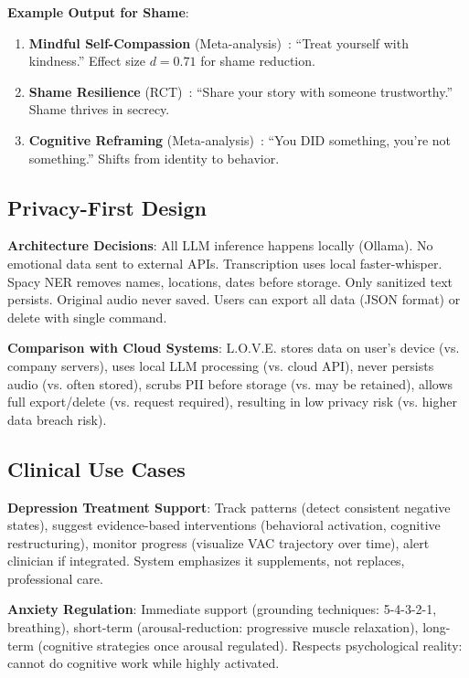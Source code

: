 \documentclass[10pt,twocolumn]{article}
\begin{document}
\textbf{Example Output for Shame}:
\begin{enumerate}
    \item \textbf{Mindful Self-Compassion} (Meta-analysis)~\cite{ferrari2019}: ``Treat yourself with kindness.'' Effect size $d=0.71$ for shame reduction.
    \item \textbf{Shame Resilience} (RCT)~\cite{brown2006}: ``Share your story with someone trustworthy.'' Shame thrives in secrecy.
    \item \textbf{Cognitive Reframing} (Meta-analysis)~\cite{hofmann2012}: ``You DID something, you're not something.'' Shifts from identity to behavior.
\end{enumerate}

\subsection{Privacy-First Design}

\textbf{Architecture Decisions}: All LLM inference happens locally (Ollama). No emotional data sent to external APIs. Transcription uses local faster-whisper. Spacy NER removes names, locations, dates before storage. Only sanitized text persists. Original audio never saved. Users can export all data (JSON format) or delete with single command.

\textbf{Comparison with Cloud Systems}: L.O.V.E. stores data on user's device (vs. company servers), uses local LLM processing (vs. cloud API), never persists audio (vs. often stored), scrubs PII before storage (vs. may be retained), allows full export/delete (vs. request required), resulting in low privacy risk (vs. higher data breach risk).

\subsection{Clinical Use Cases}

\textbf{Depression Treatment Support}: Track patterns (detect consistent negative states), suggest evidence-based interventions (behavioral activation, cognitive restructuring), monitor progress (visualize VAC trajectory over time), alert clinician if integrated. System emphasizes it supplements, not replaces, professional care.

\textbf{Anxiety Regulation}: Immediate support (grounding techniques: 5-4-3-2-1, breathing), short-term (arousal-reduction: progressive muscle relaxation), long-term (cognitive strategies once arousal regulated). Respects psychological reality: cannot do cognitive work while highly activated.
\end{document}
